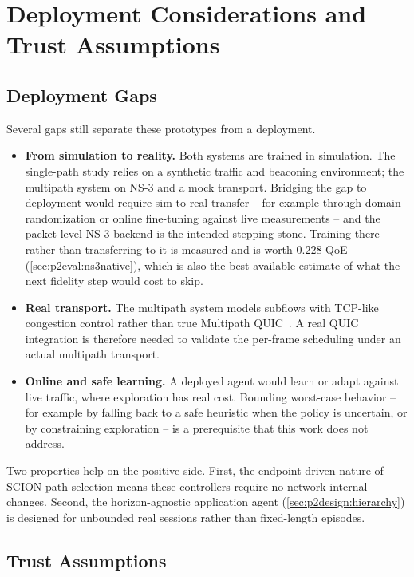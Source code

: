 \section{Deployment Considerations and Trust Assumptions}
\label{sec:analysis:deployability}

\subsection{Deployment Gaps}
Several gaps still separate these prototypes from a deployment.

\begin{itemize}
  \item \textbf{From simulation to reality.} Both systems are trained in simulation. The single-path study
  relies on a synthetic traffic and beaconing environment; the multipath system on NS-3 and a mock
  transport. Bridging the gap to deployment would require sim-to-real transfer -- for example through domain
  randomization or online fine-tuning against live measurements -- and the packet-level NS-3 backend is the
  intended stepping stone. Training there rather than transferring to it is measured and is worth
  $0.228$ QoE (\cref{sec:p2eval:ns3native}), which is also the best available estimate of what the next
  fidelity step would cost to skip.
  \item \textbf{Real transport.} The multipath system models subflows with TCP-like congestion control
  rather than true Multipath QUIC~\cite{DeConinck2017}. A real QUIC integration is therefore needed to
  validate the per-frame scheduling under an actual multipath transport.
  \item \textbf{Online and safe learning.} A deployed agent would learn or adapt against live traffic, where
  exploration has real cost. Bounding worst-case behavior -- for example by falling back to a safe heuristic
  when the policy is uncertain, or by constraining exploration -- is a prerequisite that this work does not
  address.
\end{itemize}

Two properties help on the positive side. First, the endpoint-driven nature of SCION path selection means
these controllers require no network-internal changes. Second, the horizon-agnostic application agent
(\cref{sec:p2design:hierarchy}) is designed for unbounded real sessions rather than fixed-length episodes.

\subsection{Trust Assumptions}

